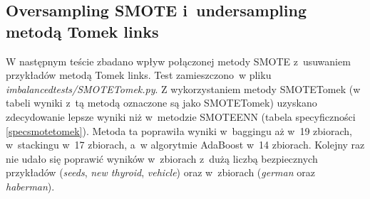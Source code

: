 \subsection{Oversampling SMOTE i~undersampling metodą Tomek links}
W następnym teście zbadano wpływ połączonej metody SMOTE z~usuwaniem przykładów metodą Tomek links. Test zamieszczono w pliku \textit{imbalancedtests/SMOTETomek.py}. Z wykorzystaniem metody SMOTETomek (w tabeli wyniki z~tą metodą oznaczone są jako SMOTETomek) uzyskano zdecydowanie lepsze wyniki niż w~metodzie SMOTEENN (tabela specyficzności \ref{specsmotetomek}). Metoda ta poprawiła wyniki w~baggingu aż w~19 zbiorach, w~stackingu w~17 zbiorach, a~w algorytmie AdaBoost w~14 zbiorach. Kolejny raz nie udało się poprawić wyników w~zbiorach z~dużą liczbą bezpiecznych przykładów (\textit{seeds}, \textit{new thyroid}, \textit{vehicle}) oraz w~zbiorach (\textit{german} oraz \textit{haberman}).

